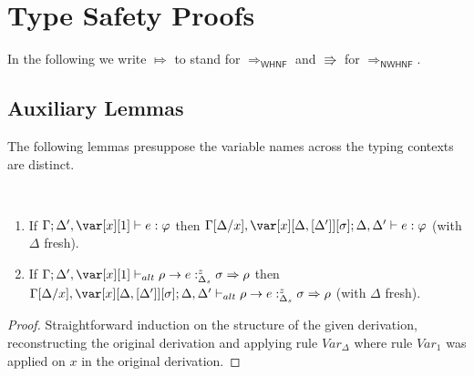 \documentclass[acmsmall,review,anonymous,screen]{acmart}
\begin{document}





\appendix

\section{Type Safety Proofs}\label{app:proofs}

In the following we write $\Mapsto$ to stand for
$\Rightarrow_\mathsf{WHNF}$ and $\Rrightarrow$ for $\Rightarrow_\mathsf{NWHNF}$.

\subsection{Auxiliary Lemmas}
The following lemmas presuppose the variable names across the typing
contexts are distinct.

  \begin{lemma}~\label{lem:onedelta-app}

    \begin{enumerate}
    
      \item If $\G; \D',\xl \vdash e :\vp$
        then $\G[\D/x],\xD; \D,\D' \vdash e : \vp$ (with $\Delta$ fresh).
      \item If $\G ; \D' , \xl \vdash_{alt} \rho \rightarrow e
        :^z_{\Delta_s} \sigma \Rightarrow \rho$ then
        $\G[\D/x],\xD;\D,\D' \vdash_{alt} \rho \rightarrow e
        :^z_{\Delta_s} \sigma \Rightarrow \rho$ (with $\Delta$ fresh).
   
      \end{enumerate}
\end{lemma}
\begin{proof}
Straightforward induction on the structure of the given derivation,
reconstructing the original derivation and applying rule
$\mathit{Var}_\Delta$ where rule $\mathit{Var}_1$ was applied on
$x$ in the original derivation.
\end{proof}
\onedelta*
\end{document}
